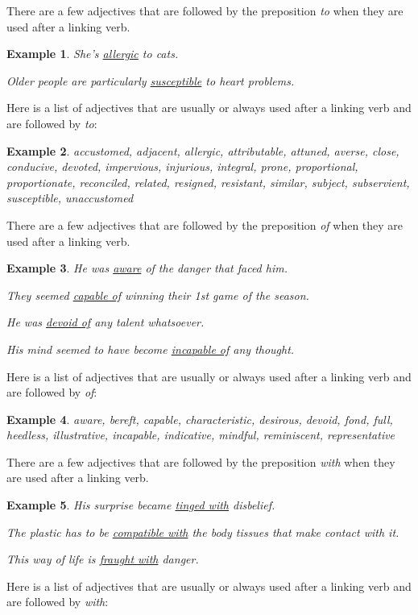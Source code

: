 \documentclass[oneside]{book}
\numberwithin{equation}{section}
\newtheorem{example}{Example}[section]
\begin{document}
%
\noindent{} There are a few adjectives that are followed by the preposition \textit{to} when they are used after a linking verb.
\begin{example}
    She's \underline{allergic} to cats.
    
    Older people are particularly \underline{susceptible} to heart problems.
\end{example}
Here is a list of adjectives that are usually or always used after a linking verb and are followed by \textit{to}:
\begin{example}
    accustomed, adjacent, allergic, attributable, attuned, averse, close, conducive, devoted, impervious, injurious, integral, prone, proportional, proportionate, reconciled, related, resigned, resistant, similar, subject, subservient, susceptible, unaccustomed
\end{example}
%
\noindent{} There are a few adjectives that are followed by the preposition \textit{of} when they are used after a linking verb.
\begin{example}
    He was \underline{aware} of the danger that faced him.
    
    They seemed \underline{capable of} winning their 1st game of the season.
    
    He was \underline{devoid of} any talent whatsoever.
    
    His mind seemed to have become \underline{incapable of} any thought.
\end{example}
Here is a list of adjectives that are usually or always used after a linking verb and are followed by \textit{of}:
\begin{example}
    aware, bereft, capable, characteristic, desirous, devoid, fond, full, heedless, illustrative, incapable, indicative, mindful, reminiscent, representative
\end{example}
%
\noindent{} There are a few adjectives that are followed by the preposition \textit{with} when they are used after a linking verb.
\begin{example}
    His surprise became \underline{tinged with} disbelief.
    
    The plastic has to be \underline{compatible with} the body tissues that make contact with it.
    
    This way of life is \underline{fraught with} danger.
\end{example}
Here is a list of adjectives that are usually or always used after a linking verb and are followed by \textit{with}:
\end{document}
